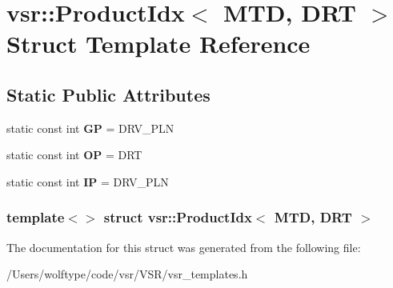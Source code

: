 \hypertarget{structvsr_1_1_product_idx_3_01_m_t_d_00_01_d_r_t_01_4}{\section{vsr\-:\-:Product\-Idx$<$ M\-T\-D, D\-R\-T $>$ Struct Template Reference}
\label{structvsr_1_1_product_idx_3_01_m_t_d_00_01_d_r_t_01_4}
}
\subsection*{Static Public Attributes}
\begin{DoxyCompactItemize}
\item 
\hypertarget{structvsr_1_1_product_idx_3_01_m_t_d_00_01_d_r_t_01_4_aa616474b48c2b7615d0fe8ddfebb469c}{static const int {\bfseries G\-P} = D\-R\-V\-\_\-\-P\-L\-N}\label{structvsr_1_1_product_idx_3_01_m_t_d_00_01_d_r_t_01_4_aa616474b48c2b7615d0fe8ddfebb469c}

\item 
\hypertarget{structvsr_1_1_product_idx_3_01_m_t_d_00_01_d_r_t_01_4_a00c9a5071bd4b5206c3904b6ab6c8c57}{static const int {\bfseries O\-P} = D\-R\-T}\label{structvsr_1_1_product_idx_3_01_m_t_d_00_01_d_r_t_01_4_a00c9a5071bd4b5206c3904b6ab6c8c57}

\item 
\hypertarget{structvsr_1_1_product_idx_3_01_m_t_d_00_01_d_r_t_01_4_a4c68db9d2070dbbe6d75a5ba5067ef4e}{static const int {\bfseries I\-P} = D\-R\-V\-\_\-\-P\-L\-N}\label{structvsr_1_1_product_idx_3_01_m_t_d_00_01_d_r_t_01_4_a4c68db9d2070dbbe6d75a5ba5067ef4e}

\end{DoxyCompactItemize}
\subsubsection*{template$<$$>$ struct vsr\-::\-Product\-Idx$<$ M\-T\-D, D\-R\-T $>$}



The documentation for this struct was generated from the following file\-:\begin{DoxyCompactItemize}
\item 
/\-Users/wolftype/code/vsr/\-V\-S\-R/vsr\-\_\-templates.\-h\end{DoxyCompactItemize}

